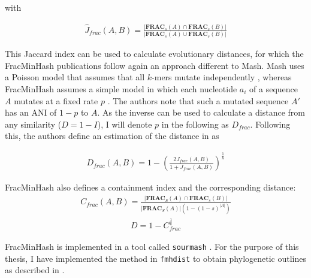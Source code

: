 with

\begin{align}
  \hat{J}_{frac}(A, B) = \frac{|\mathbf{FRAC}_s(A) \cap \mathbf{FRAC}_s(B)|}{|\mathbf{FRAC}_s(A) \cup \mathbf{FRAC}_s(B)|}  
\end{align}

This Jaccard index can be used to calculate evolutionary distances, for which
the FracMinHash publications follow again an approach different to Mash. Mash
uses a Poisson model that assumes that all $k$-mers mutate independently
\cite{ondovMashFastGenome2016,heraDerivingConfidenceIntervals2023,fanAssemblyAlignmentfreeMethod2015},
whereas FracMinHash assumes a simple model in which each nucleotide $a_i$ of a
sequence $A$ mutates at a fixed rate $p$
\cite{heraDerivingConfidenceIntervals2023}. The authors note that such a mutated
sequence $A'$ has an ANI of $1-p$ to $A$. As the inverse can be used to
calculate a distance from any similarity ($D = 1 - I$), I will denote $p$ in the
following as $D_{frac}$. Following this, the authors define an estimation of the
distance in \cite{heraDerivingConfidenceIntervals2023} as

\begin{align}
  D_{frac}(A, B) = 1 - (\frac{2J_{frac}(A,B)}{1+J_{frac}(A, B)})^{\frac{1}{k}}
\end{align}

FracMinHash also defines a containment index and the corresponding distance:
\begin{align}
  C_{frac}(A, B) = \frac{|\mathbf{FRAC}_S(A) \cap \mathbf{FRAC}_s(B)|}{|\mathbf{FRAC}_S(A)| (1-(1-s)^{|A|})}
\end{align}
\begin{align}
  D=1-C_{frac}^{\frac{1}{k}}
\end{align}

FracMinHash is implemented in a tool called \texttt{sourmash}
\cite{irberLightweightCompositionalAnalysis2022,irberDecentralizingIndicesGenomic2020}.
For the purpose of this thesis, I have implemented the method in
\texttt{fmhdist} to obtain phylogenetic outlines as described in
\cite{bagciMicrobialPhylogeneticContext2021}.
